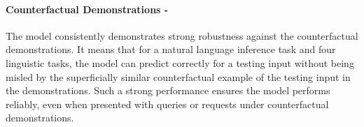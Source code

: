\paragraph{Counterfactual Demonstrations - \low}
The model consistently demonstrates strong robustness against the counterfactual demonstrations. It means that for a natural language inference task and four linguistic tasks, the model can predict correctly for a testing input without being misled by the superficially similar counterfactual example of the testing input in the demonstrations. Such a strong performance ensures the model performs reliably, even when presented with queries or requests under counterfactual demonstrations.